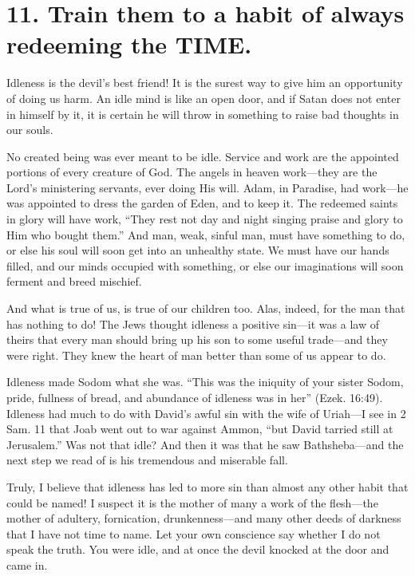 \documentclass[
]{book}
\begin{document}
\hypertarget{train-them-to-a-habit-of-always-redeeming-the-time.}{%
\section*{11. Train them to a habit of always redeeming the TIME.}\label{train-them-to-a-habit-of-always-redeeming-the-time.}}

Idleness is the devil's best friend! It is the surest way to give him an opportunity of doing us harm. An idle mind is like an open door, and if Satan does not enter in himself by it, it is certain he will throw in something to raise bad thoughts in our souls.

No created being was ever meant to be idle. Service and work are the appointed portions of every creature of God. The angels in heaven work---they are the Lord's ministering servants, ever doing His will. Adam, in Paradise, had work---he was appointed to dress the garden of Eden, and to keep it. The redeemed saints in glory will have work, ``They rest not day and night singing praise and glory to Him who bought them.'' And man, weak, sinful man, must have something to do, or else his soul will soon get into an unhealthy state. We must have our hands filled, and our minds occupied with something, or else our imaginations will soon ferment and breed mischief.

And what is true of us, is true of our children too. Alas, indeed, for the man that has nothing to do! The Jews thought idleness a positive sin---it was a law of theirs that every man should bring up his son to some useful trade---and they were right. They knew the heart of man better than some of us appear to do.

Idleness made Sodom what she was. ``This was the iniquity of your sister Sodom, pride, fullness of bread, and abundance of idleness was in her'' (Ezek. 16:49). Idleness had much to do with David's awful sin with the wife of Uriah---I see in 2 Sam. 11 that Joab went out to war against Ammon, ``but David tarried still at Jerusalem.'' Was not that idle? And then it was that he saw Bathsheba---and the next step we read of is his tremendous and miserable fall.

Truly, I believe that idleness has led to more sin than almost any other habit that could be named! I suspect it is the mother of many a work of the flesh---the mother of adultery, fornication, drunkenness---and many other deeds of darkness that I have not time to name. Let your own conscience say whether I do not speak the truth. You were idle, and at once the devil knocked at the door and came in.
\end{document}
